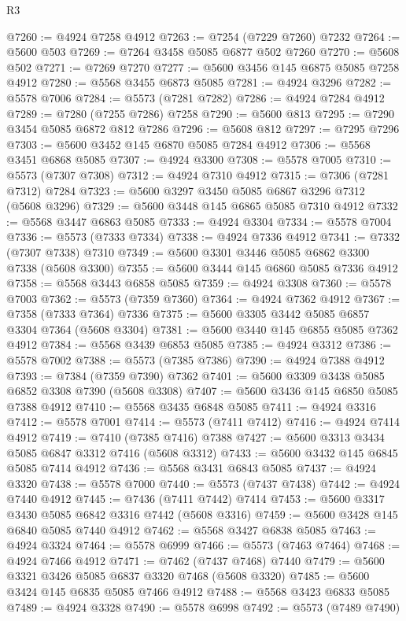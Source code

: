 \begin{lexlean}{R3}
\begin{coremodule}
@7260 := @4924 @7258 @4912
@7263 := @7254 (@7229 @7260) @7232
@7264 := @5600 @503
@7269 := @7264 @3458 @5085 @6877 @502 @7260
@7270 := @5608 @502
@7271 := @7269 @7270
@7277 := @5600 @3456 @145 @6875 @5085 @7258 @4912
@7280 := @5568 @3455 @6873 @5085
@7281 := @4924 @3296
@7282 := @5578 @7006
@7284 := @5573 (@7281 @7282)
@7286 := @4924 @7284 @4912
@7289 := @7280 (@7255 @7286) @7258
@7290 := @5600 @813
@7295 := @7290 @3454 @5085 @6872 @812 @7286
@7296 := @5608 @812
@7297 := @7295 @7296
@7303 := @5600 @3452 @145 @6870 @5085 @7284 @4912
@7306 := @5568 @3451 @6868 @5085
@7307 := @4924 @3300
@7308 := @5578 @7005
@7310 := @5573 (@7307 @7308)
@7312 := @4924 @7310 @4912
@7315 := @7306 (@7281 @7312) @7284
@7323 := @5600 @3297 @3450 @5085 @6867 @3296 @7312 (@5608 @3296)
@7329 := @5600 @3448 @145 @6865 @5085 @7310 @4912
@7332 := @5568 @3447 @6863 @5085
@7333 := @4924 @3304
@7334 := @5578 @7004
@7336 := @5573 (@7333 @7334)
@7338 := @4924 @7336 @4912
@7341 := @7332 (@7307 @7338) @7310
@7349 := @5600 @3301 @3446 @5085 @6862 @3300 @7338 (@5608 @3300)
@7355 := @5600 @3444 @145 @6860 @5085 @7336 @4912
@7358 := @5568 @3443 @6858 @5085
@7359 := @4924 @3308
@7360 := @5578 @7003
@7362 := @5573 (@7359 @7360)
@7364 := @4924 @7362 @4912
@7367 := @7358 (@7333 @7364) @7336
@7375 := @5600 @3305 @3442 @5085 @6857 @3304 @7364 (@5608 @3304)
@7381 := @5600 @3440 @145 @6855 @5085 @7362 @4912
@7384 := @5568 @3439 @6853 @5085
@7385 := @4924 @3312
@7386 := @5578 @7002
@7388 := @5573 (@7385 @7386)
@7390 := @4924 @7388 @4912
@7393 := @7384 (@7359 @7390) @7362
@7401 := @5600 @3309 @3438 @5085 @6852 @3308 @7390 (@5608 @3308)
@7407 := @5600 @3436 @145 @6850 @5085 @7388 @4912
@7410 := @5568 @3435 @6848 @5085
@7411 := @4924 @3316
@7412 := @5578 @7001
@7414 := @5573 (@7411 @7412)
@7416 := @4924 @7414 @4912
@7419 := @7410 (@7385 @7416) @7388
@7427 := @5600 @3313 @3434 @5085 @6847 @3312 @7416 (@5608 @3312)
@7433 := @5600 @3432 @145 @6845 @5085 @7414 @4912
@7436 := @5568 @3431 @6843 @5085
@7437 := @4924 @3320
@7438 := @5578 @7000
@7440 := @5573 (@7437 @7438)
@7442 := @4924 @7440 @4912
@7445 := @7436 (@7411 @7442) @7414
@7453 := @5600 @3317 @3430 @5085 @6842 @3316 @7442 (@5608 @3316)
@7459 := @5600 @3428 @145 @6840 @5085 @7440 @4912
@7462 := @5568 @3427 @6838 @5085
@7463 := @4924 @3324
@7464 := @5578 @6999
@7466 := @5573 (@7463 @7464)
@7468 := @4924 @7466 @4912
@7471 := @7462 (@7437 @7468) @7440
@7479 := @5600 @3321 @3426 @5085 @6837 @3320 @7468 (@5608 @3320)
@7485 := @5600 @3424 @145 @6835 @5085 @7466 @4912
@7488 := @5568 @3423 @6833 @5085
@7489 := @4924 @3328
@7490 := @5578 @6998
@7492 := @5573 (@7489 @7490)

\end{coremodule}
\end{lexlean}
